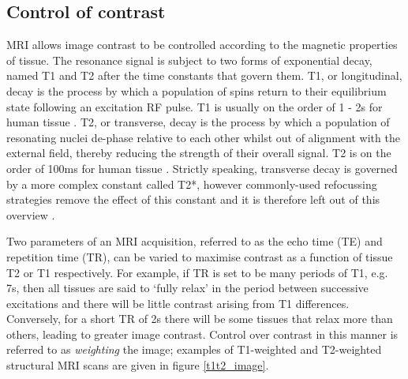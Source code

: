 \documentclass[12pt]{report}
\begin{document}

\subsection{Control of contrast}

MRI allows image contrast to be controlled according to the magnetic properties of tissue. The resonance signal is subject to two forms of exponential decay, named T1 and T2 after the time constants that govern them. T1, or longitudinal, decay is the process by which a population of spins return to their equilibrium state following an excitation RF pulse. T1 is usually on the order of 1 - 2s for human tissue \cite{Alsop2015}. T2, or transverse, decay is the process by which a population of resonating nuclei de-phase relative to each other whilst out of alignment with the external field, thereby reducing the strength of their overall signal. T2 is on the order of 100ms for human tissue \cite{Buxton2009}. Strictly speaking, transverse decay is governed by a more complex constant called T2*, however commonly-used refocussing strategies remove the effect of this constant and it is therefore left out of this overview \cite{bushberg2011}. 

Two parameters of an MRI acquisition, referred to as the echo time (TE) and repetition time (TR), can be varied to maximise contrast as a function of tissue T2 or T1 respectively. For example, if TR is set to be many periods of T1, e.g. 7s, then all tissues are said to `fully relax' in the period between successive excitations and there will be little contrast arising from T1 differences. Conversely, for a short TR of 2s there will be some tissues that relax more than others, leading to greater image contrast. Control over contrast in this manner is referred to as \textit{weighting} the image; examples of T1-weighted and T2-weighted structural MRI scans are given in figure \ref{t1t2_image}. 
\end{document}
